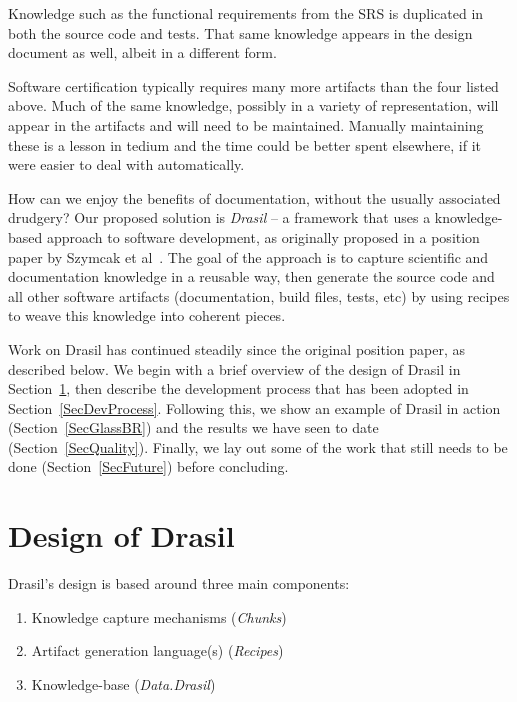 \documentclass[sigconf]{acmart}
\begin{document}
Knowledge such as the functional requirements from the SRS is duplicated in 
both the source code and tests. That same knowledge appears in the design 
document as well, albeit in a different form. 

Software certification typically requires many more 
artifacts than the four listed above. Much of the same knowledge, possibly in a
variety of representation, will appear in the artifacts and will need to be
maintained. Manually maintaining these is a lesson in tedium and the
time could be better spent elsewhere, if 
it were easier to deal with automatically.


How can we enjoy the benefits of documentation, without the usually associated
drudgery?  Our proposed solution is \textit{Drasil} -- a framework that uses
a knowledge-based approach to software development, as originally proposed in a
position paper by Szymcak et al~\cite{SzymczakEtAl2016}. The goal of the
approach is to capture scientific and documentation knowledge in a reusable way,
then generate the source code and all other software artifacts
(documentation, build files, tests, etc) by using recipes to weave this
knowledge into coherent pieces.

Work on Drasil has continued steadily since the original position paper, as
described below. We begin with a brief overview of the design of Drasil
in Section~\ref{SecDesign}, then describe the development process that
has been adopted in Section~\ref{SecDevProcess}. Following this, we show an example of
Drasil in action (Section~\ref{SecGlassBR}) and the results we have seen to date
(Section~\ref{SecQuality}). Finally, we lay out some of the work that still
needs to be done (Section~\ref{SecFuture}) before concluding.

\newpage
\section{Design of Drasil} \label{SecDesign}

Drasil's design is based around three main components:
\begin{enumerate}
    \item Knowledge capture mechanisms (\textit{Chunks})
    \item Artifact generation language(s) (\textit{Recipes})
    \item Knowledge-base (\textit{Data.Drasil})
\end{enumerate}
\end{document}
